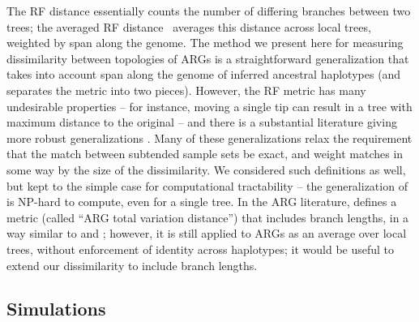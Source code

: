 \documentclass[10pt,twoside,lineno]{gsajnl}
\begin{document}
The RF distance \citep{robinson1981comparison}
essentially counts the number of differing branches between two trees;
the averaged RF distance~\citep{kuhner2015assessing}
averages this distance across local trees, weighted by span along the genome.
The method we present here for measuring dissimilarity between topologies of ARGs
is a straightforward generalization
that takes into account span along the genome of inferred ancestral haplotypes
(and separates the metric into two pieces).
However, the RF metric has many undesirable properties --
for instance, moving a single tip can result in a tree with maximum distance to the original --
and there is a substantial literature giving more robust generalizations
\citep[reviewed by][]{llabres2021generalized}.
Many of these generalizations \citep[e.g.,][]{bocker2013generalized}
relax the requirement that the match between subtended sample sets be exact,
and weight matches in some way by the size of the dissimilarity.
We considered such definitions as well, but kept to the simple case
for computational tractability --
the generalization of \citet{bocker2013generalized} is NP-hard to compute, even for a single tree.
In the ARG literature, \citet{zhang2023biobankscale}
defines a metric (called ``ARG total variation distance'') that includes branch lengths,
in a way similar to \citet{robinson1979comparison} and \citet{kuhner1994simulation};
however, it is still applied to ARGs as an average over local trees,
without enforcement of identity across haplotypes;
it would be useful to extend our dissimilarity to include branch lengths.

\subsection{Simulations}
\end{document}
